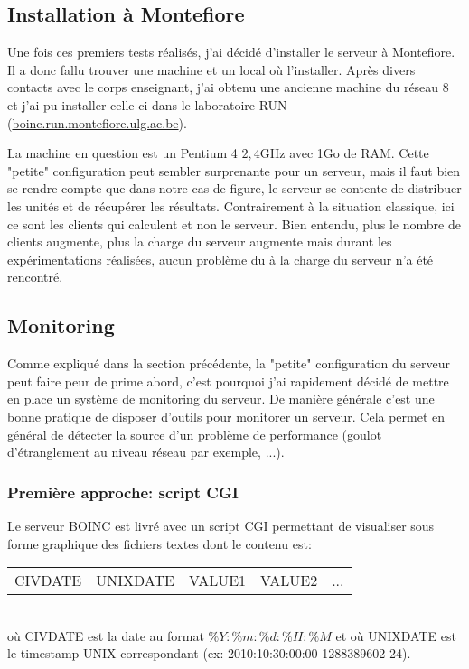 \documentclass[a4paper, 11pt]{article}
\begin{document}

\subsection{Installation à Montefiore}
Une fois ces premiers tests réalisés, j'ai décidé d'installer le serveur à Montefiore. Il a donc fallu trouver une machine et un local où l'installer. Après divers contacts avec le corps enseignant, j'ai obtenu une ancienne machine du réseau 8 et j'ai pu installer celle-ci dans le laboratoire RUN (\url{boinc.run.montefiore.ulg.ac.be}).

La machine en question est un Pentium 4 \@ $2,4$GHz avec 1Go de RAM. Cette "petite" configuration peut sembler surprenante pour un serveur, mais il faut bien se rendre compte que dans notre cas de figure, le serveur se contente de distribuer les unités et de récupérer les résultats. Contrairement à la situation classique, ici ce sont les clients qui calculent et non le serveur. Bien entendu, plus le nombre de clients augmente, plus la charge du serveur augmente mais durant les expérimentations réalisées, aucun problème du à la charge du serveur n'a été rencontré.

\subsection{Monitoring}
Comme expliqué dans la section précédente, la "petite" configuration du serveur peut faire peur de prime abord, c'est pourquoi j'ai rapidement décidé de mettre en place un système de monitoring du serveur. De manière générale c'est une bonne pratique de disposer d'outils pour monitorer un serveur. Cela permet en général de détecter la source d'un problème de performance (goulot d'étranglement au niveau réseau par exemple, ...).

\subsubsection{Première approche: script CGI}
Le serveur \textsc{BOINC} est livré avec un script CGI permettant de visualiser sous forme graphique des fichiers textes dont le contenu est:\\
\begin{tabular}{ccccc}
CIVDATE & UNIXDATE & VALUE1 & VALUE2 & ...\\
\end{tabular}\\
où CIVDATE est la date au format $\%Y:\%m:\%d:\%H:\%M$ et où UNIXDATE est le timestamp UNIX correspondant (ex: 2010:10:30:00:00 1288389602 24).
\end{document}
